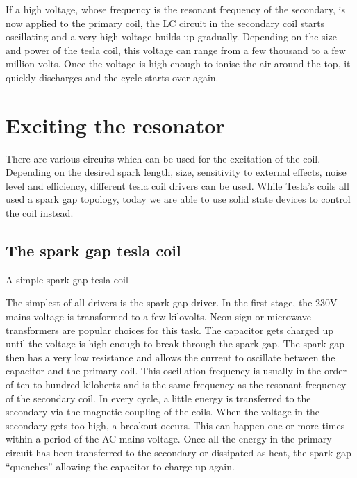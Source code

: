 If a high voltage, whose frequency is the resonant frequency of the secondary, is now applied to the primary coil, the LC circuit in the secondary coil starts oscillating and a very high voltage builds up gradually. Depending on the size and power of the tesla coil, this voltage can range from a few thousand to a few million volts. Once the voltage is high enough to ionise the air around the top, it quickly discharges and the cycle starts over again.

\section{Exciting the resonator}

There are various circuits which can be used for the excitation of the coil. Depending on the desired spark length, size, sensitivity to external effects, noise level and efficiency, different tesla coil drivers can be used. While Tesla's coils all used a spark gap topology, today we are able to use solid state devices to control the coil instead.

\subsection{The spark gap tesla coil}

\begin{marginfigure}
\missingfigure[figwidth=\textwidwth, figcolor=white]{}
\caption{A simple spark gap tesla coil}
\end{marginfigure}

The simplest of all drivers is the spark gap driver. In the first stage, the 230V mains voltage is transformed to a few kilovolts. Neon sign or microwave transformers are popular choices for this task. The capacitor gets charged up until the voltage is high enough to break through the spark gap. The spark gap then has a very low resistance and allows the current to oscillate between the capacitor and the primary coil. This oscillation frequency is usually in the order of ten to hundred kilohertz and is the same frequency as the resonant frequency of the secondary coil. In every cycle, a little energy is transferred to the secondary via the magnetic coupling of the coils. When the voltage in the secondary gets too high, a breakout occurs. This can happen one or more times within a period of the AC mains voltage. Once all the energy in the primary circuit has been transferred to the secondary or dissipated as heat, the spark gap \enquote{quenches} allowing the capacitor to charge up again.

